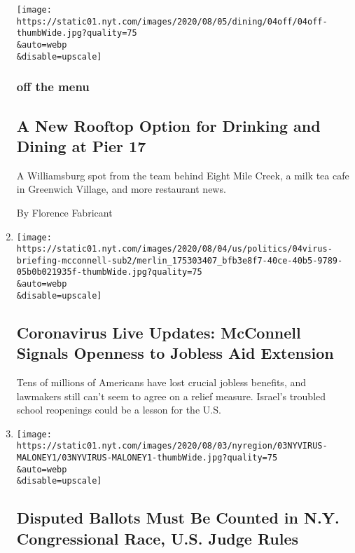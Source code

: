 \begin{enumerate}
  \texttt{[image: https://static01.nyt.com/images/2020/08/05/dining/04off/04off-thumbWide.jpg?quality=75\\\&auto=webp\\\&disable=upscale]}

  \hypertarget{off-the-menu}{%
  \subsubsection{off the menu}\label{off-the-menu}}

  \hypertarget{a-new-rooftop-option-for-drinking-and-dining-at-pier-17}{%
  \subsection{A New Rooftop Option for Drinking and Dining at Pier
  17}\label{a-new-rooftop-option-for-drinking-and-dining-at-pier-17}}

  A Williamsburg spot from the team behind Eight Mile Creek, a milk tea
  cafe in Greenwich Village, and more restaurant news.

  By Florence Fabricant
\item
  \href{/2020/08/04/world/coronavirus-cases.html}{}

  \texttt{[image: https://static01.nyt.com/images/2020/08/04/us/politics/04virus-briefing-mcconnell-sub2/merlin\_175303407\_bfb3e8f7-40ce-40b5-9789-05b0b021935f-thumbWide.jpg?quality=75\\\&auto=webp\\\&disable=upscale]}

  \hypertarget{coronavirus-live-updates-mcconnell-signals-openness-to-jobless-aid-extension}{%
  \subsection{Coronavirus Live Updates: McConnell Signals Openness to
  Jobless Aid
  Extension}\label{coronavirus-live-updates-mcconnell-signals-openness-to-jobless-aid-extension}}

  Tens of millions of Americans have lost crucial jobless benefits, and
  lawmakers still can't seem to agree on a relief measure. Israel's
  troubled school reopenings could be a lesson for the U.S.
\item
  \href{/2020/08/03/nyregion/nyc-congress-carolyn-maloney-ballots.html}{}

  \texttt{[image: https://static01.nyt.com/images/2020/08/03/nyregion/03NYVIRUS-MALONEY1/03NYVIRUS-MALONEY1-thumbWide.jpg?quality=75\\\&auto=webp\\\&disable=upscale]}

  \hypertarget{disputed-ballots-must-be-counted-in-ny-congressional-race-us-judge-rules}{%
  \subsection{Disputed Ballots Must Be Counted in N.Y. Congressional
  Race, U.S. Judge
  Rules}\label{disputed-ballots-must-be-counted-in-ny-congressional-race-us-judge-rules}}


\end{enumerate}
